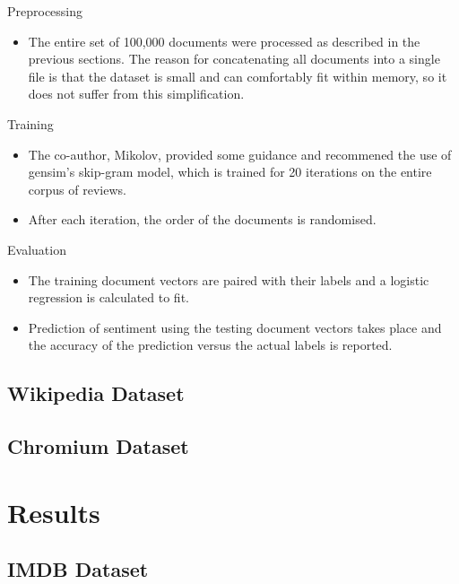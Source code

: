 \documentclass[11pt]{article}
\begin{document}
\renewcommand\labelitemi{{\boldmath$\cdot$}}
\begin{description}
  \item Preprocessing
    \begin{itemize}
      \item The entire set of 100,000 documents were processed as described in the previous sections.
      The reason for concatenating all documents into a single file is that the dataset is small and can comfortably fit within memory, so it does not suffer from this simplification.
    \end{itemize}
  \item Training
    \begin{itemize}
      \item The co-author, Mikolov, provided some guidance and recommened the use of gensim's skip-gram model, which is trained for 20 iterations on the entire corpus of reviews.
      \item After each iteration, the order of the documents is randomised.
    \end{itemize}
  \item Evaluation
    \begin{itemize}
      \item The training document vectors are paired with their labels and a logistic regression is calculated to fit.
      \item Prediction of sentiment using the testing document vectors takes place and the accuracy of the prediction versus the actual labels is reported.
    \end{itemize}
\end{description}


\subsection*{Wikipedia Dataset}

\subsection*{Chromium Dataset}


\section*{Results}

\subsection*{IMDB Dataset}
\end{document}
